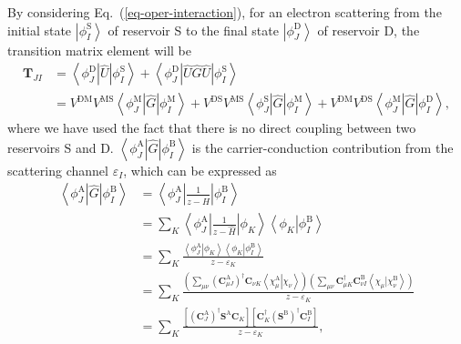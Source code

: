 \documentclass[a4paper,11pt,twoside,openright]{book}
\begin{document}
By considering Eq.~(\ref{eq-oper-interaction}), for an electron scattering from the initial state
$\left|\phi_{I}^{\text{S}}\right\rangle$ of reservoir S to the final state $\left|\phi_{J}^{\text{D}}\right\rangle$
of reservoir D, the transition matrix element will be\cite{Jiang-JCP124-034708}
\begin{align}
  \label{eq-trans-matrix}
  \mathbf{T}_{JI}
  &=\left\langle\phi_{J}^{\text{D}}\left|\hat{U}\right|\phi_{I}^{\text{S}}\right\rangle
  +\left\langle\phi_{J}^{\text{D}}\left|\hat{U}\hat{G}\hat{U}\right|\phi_{I}^{\text{S}}\right\rangle\\
  &=V^{\text{DM}}V^{\text{MS}}\left\langle\phi_{J}^{\text{M}}\left|\hat{G}\right|\phi_{I}^{\text{M}}\right\rangle%
    +V^{\text{DS}}V^{\text{MS}}\left\langle\phi_{J}^{\text{S}}\left|\hat{G}\right|\phi_{I}^{\text{M}}\right\rangle%
    +V^{\text{DM}}V^{\text{DS}}\left\langle\phi_{J}^{\text{M}}\left|\hat{G}\right|\phi_{I}^{\text{D}}\right\rangle,\nonumber
\end{align}
where we have used the fact that there is no direct coupling between two reservoirs S and D.
$\left\langle\phi_{J}^{\text{A}}\left|\hat{G}\right|\phi_{I}^{\text{B}}\right\rangle$ is the carrier-conduction
contribution from the scattering channel $\varepsilon_{I}$, which can be expressed as
\begin{align}
  \label{eq-Green-function-MO}
  \left\langle\phi_{J}^{\text{A}}\left|\hat{G}\right|\phi_{I}^{\text{B}}\right\rangle
  &=\left\langle\phi_{J}^{\text{A}}\left|\frac{1}{z-\hat{H}}\right|\phi_{I}^{\text{B}}\right\rangle\\
  &=\sum_{K}\left\langle\phi_{J}^{\text{A}}\left|\frac{1}{z-\hat{H}}\right|\phi_{K}\right\rangle%
    \left\langle\phi_{K}\left|\phi_{I}^{\text{B}}\right.\right\rangle\nonumber\\
  &=\sum_{K}\frac{\left\langle\left.\phi_{J}^{\text{A}}\right|\phi_{K}\right\rangle%
    \left\langle\phi_{K}\left|\phi_{I}^{\text{B}}\right.\right\rangle}{z-\varepsilon_{K}}\nonumber\\
  &=\sum_{K}\frac{\left(\sum_{\mu\nu}\left(\mathbf{C}_{\mu J}^{\text{A}}\right)^{\dagger}\mathbf{C}_{\nu K}%
    \left\langle\left.\chi_{\mu}^{\text{A}}\right|\chi_{\nu}\right\rangle\right)%
    \left(\sum_{\mu\nu}\mathbf{C}_{\mu K}^{\dagger}\mathbf{C}_{\nu I}^{\text{B}}%
    \left\langle\chi_{\mu}\left|\chi_{\nu}^{\text{B}}\right.\right\rangle\right)}{z-\varepsilon_{K}}\nonumber\\
  &=\sum_{K}\frac{\left[\left(\mathbf{C}^{\text{A}}_{J}\right)^{\dagger}\mathbf{S}^{\text{A}}\mathbf{C}_{K}\right]%
    \left[\mathbf{C}_{K}^{\dagger}\left(\mathbf{S}^{\text{B}}\right)^{\dagger}\mathbf{C}^{\text{B}}_{I}\right]}{z-\varepsilon_{K}},\nonumber
\end{align}
\end{document}
